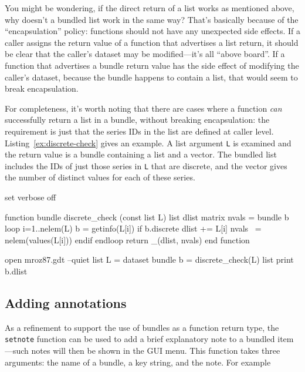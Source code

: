 You might be wondering, if the direct return of a list works as
mentioned above, why doesn't a bundled list work in the same way?
That's basically because of the ``encapsulation'' policy: functions
should not have any unexpected side effects. If a caller assigns the
return value of a function that advertises a list return, it should be
clear that the caller's dataset may be modified---it's all ``above
board''. If a function that advertises a bundle return value has the
side effect of modifying the caller's dataset, because the bundle
happens to contain a list, that would seem to break encapsulation.

For completeness, it's worth noting that there are cases where a
function \textit{can} successfully return a list in a bundle, without
breaking encapsulation: the requirement is just that the series IDs in
the list are defined at caller
level. Listing~\ref{ex:discrete-check} gives an example. A list
argument \texttt{L} is examined and the return value is a bundle
containing a list and a vector. The bundled list includes the IDs of
just those series in \texttt{L} that are discrete, and the vector
gives the number of distinct values for each of these series.

\begin{script}
\begin{scode}
set verbose off

function bundle discrete_check (const list L)
   list dlist
   matrix nvals = {}
   bundle b
   loop i=1..nelem(L)
      b = getinfo(L[i])
      if b.discrete
         dlist += L[i]
         nvals ~= nelem(values(L[i]))
      endif
   endloop
   return _(dlist, nvals)
end function

open mroz87.gdt --quiet
list L = dataset
bundle b = discrete_check(L)
list print b.dlist
\end{scode}
\end{script}

\subsection{Adding annotations}

As a refinement to support the use of bundles as a function return
type, the \texttt{setnote} function can be used to add a brief
explanatory note to a bundled item---such notes will then be shown in
the GUI menu.  This function takes three arguments: the name of a
bundle, a key string, and the note. For example

